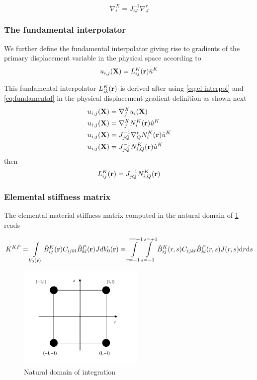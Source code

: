 \begin{equation}
\nabla_i^X=J_{iJ}^{-1}\nabla_J^r
\label{eq:fundamental}
\end{equation}


\subsubsection*{The fundamental interpolator}
We further define the fundamental interpolator giving rise to gradients of the primary displacement variable in the physical space according to
\begin{equation}
u_{i,j}(\vb{X})=L_{ij}^K(\vb{r})\hat{u}^K
\label{eq:fund operator}
\end{equation}


This fundamental interpolator  $L_{ik}^K(\vb{r})$ is derived after using \cref{eq:el interpol} and \cref{eq:fundamental} in the physical displacement gradient definition as shown next
\begin{align*}
u_{i,j}(\vb{X})&=\nabla_j^X u_i(\vb{X})\\
u_{i,j}(\vb{X})&=\nabla_j^X N_i^K(\vb{r})\hat{u}^K\\
u_{i,j}(\vb{X})&=J_{jQ}^{-1}\nabla_Q^r N_i^K(\vb{r})\hat{u}^K\\
u_{i,j}(\vb{X})&=J_{jQ}^{-1}N_{i,Q}^K(\vb{r})\hat{u}^K
\end{align*}
then
\begin{equation}
L_{ij}^K(\vb{r})=J_{jQ}^{-1}N_{i,Q}^K(\vb{r})
\label{eq:fundamental interpolator}
\end{equation}

\subsubsection*{Elemental stiffness matrix}
The elemental material stiffness matrix computed in the natural domain of \cref{fig:Nat domain} reads

\begin{equation}
K^{KP}=\int\limits_{V_0(\vb{r})} \hat{B}_{ij}^K(\vb{r}) C_{ijkl} \hat{B}_{kl}^P(\vb{r})J dV_0(\vb{r})\equiv \int\limits_{r=-1}^{r=+1}\int\limits_{s=-1}^{s=+1} \hat{B}_{ij}^K(r,s) C_{ijkl} \hat{B}_{kl}^P(r,s)J(r,s) \mathrm{d}r\mathrm{d}s
\label{eq:elematrix}
\end{equation}



\begin{figure}[h]
\centering
\includegraphics[width=6cm]{img/figure3.pdf}
\caption{Natural domain of integration}
\label{fig:Nat domain}
\end{figure}
 

